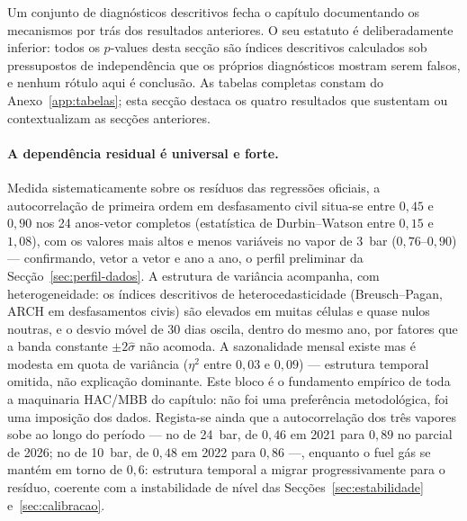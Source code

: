 
Um conjunto de diagnósticos descritivos fecha o capítulo documentando os
mecanismos por trás dos resultados anteriores. O seu estatuto é
deliberadamente inferior: todos os $p$-values desta secção são índices
descritivos calculados sob pressupostos de independência que os próprios
diagnósticos mostram serem falsos, e nenhum rótulo aqui é conclusão. As tabelas completas constam do Anexo~\ref{app:tabelas};
esta secção destaca os quatro resultados que sustentam ou contextualizam as
secções anteriores.

\paragraph{A dependência residual é universal e forte.} Medida
sistematicamente sobre os resíduos das regressões oficiais, a autocorrelação
de primeira ordem em desfasamento civil situa-se entre $0{,}45$ e $0{,}90$
nos 24 anos-vetor completos (estatística de Durbin--Watson entre $0{,}15$ e
$1{,}08$), com os valores mais altos e menos variáveis no vapor de 3~bar
($0{,}76$--$0{,}90$) --- confirmando, vetor a vetor e ano a ano, o perfil
preliminar da Secção~\ref{sec:perfil-dados}. A estrutura de variância acompanha,
com heterogeneidade: os índices descritivos de heterocedasticidade
(Breusch--Pagan, ARCH em desfasamentos civis) são elevados em muitas células
e quase nulos noutras, e o desvio móvel de 30 dias oscila, dentro do mesmo
ano, por fatores que a banda constante $\pm 2\hat\sigma$ não acomoda. A sazonalidade mensal existe mas é
modesta em quota de variância ($\eta^2$ entre $0{,}03$ e $0{,}09$) ---
estrutura temporal omitida, não explicação dominante. Este bloco é o
fundamento empírico de toda a maquinaria HAC/MBB do capítulo: não foi uma
preferência metodológica, foi uma imposição dos dados. Regista-se ainda que
a autocorrelação dos três vapores sobe ao longo do período --- no de
24~bar, de $0{,}46$ em 2021 para $0{,}89$ no parcial de 2026; no de 10~bar,
de $0{,}48$ em 2022 para $0{,}86$ ---, enquanto o fuel gás se mantém em
torno de $0{,}6$: estrutura temporal a migrar progressivamente para o
resíduo, coerente com a instabilidade de nível das
Secções~\ref{sec:estabilidade} e~\ref{sec:calibracao}.

